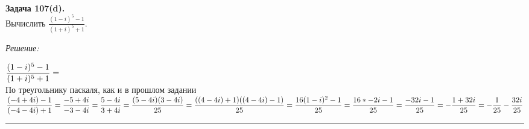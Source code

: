 \documentclass[a4paper, 12pt]{article}
\newenvironment{problem}[2][Задача]
    { \begin{mdframed}[backgroundcolor=gray!10] \textbf{#1 #2.} \\}
    {  \end{mdframed}}
\newenvironment{solution}
    {\textit{Решение: }}
    {\noindent\rule{7in}{1.5pt}}
\begin{document}
\begin{problem}{107(d)}
Вычислить $\displaystyle\frac{(1-i)^5-1}{(1+i)^5+1}$.
\end{problem}
\begin{solution}

$
\displaystyle\frac{(1 - i)^5 - 1}{(1 + i)^5 + 1} = \\
$
\\
По треугольнику паскаля, как и в прошлом задании
\\
$
\displaystyle\frac{(-4 + 4i) - 1}{(-4 - 4i) + 1} = 
\displaystyle\frac{-5 + 4i}{-3 - 4i} = 
\displaystyle\frac{5 - 4i}{3 + 4i} = 
\displaystyle\frac{(5 - 4i)(3 - 4i)}{25} = 
\displaystyle\frac{((4 - 4i) + 1)((4 - 4i) - 1)}{25} = \\
\displaystyle\frac{16(1 - i)^2 - 1}{25} = 
\displaystyle\frac{16 * -2i - 1}{25} = 
\displaystyle\frac{-32i - 1}{25} = 
-\displaystyle\frac{1 + 32i}{25} = 
-\displaystyle\frac{1}{25} - \displaystyle\frac{32i}{25} 
$

\end{solution} 
\end{document}
